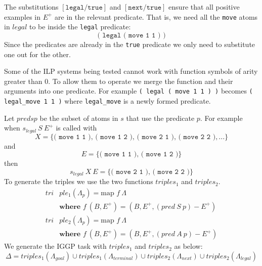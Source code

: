 The substitutions $[\texttt{legal}/\texttt{true}]$ and $[\texttt{next}/\texttt{true}]$ ensure that all positive examples in $E^+$ are in the relevant predicate. That is, we need all the \texttt{move} atoms in $legal$ to be inside the \texttt{legal} predicate:
\[\texttt{( legal ( move 1 1 ) )}\]
Since the predicates are already in the \texttt{true} predicate we only need to substitute one out for the other.

Some of the ILP systems being tested cannot work with function symbols of arity greater than 0. To allow them to operate we merge the function and their arguments into one predicate. For example \texttt{( legal ( move 1 1 ) )} becomes \verb|( legal_move 1 1 )| where \verb|legal_move| is a newly formed predicate.

Let $pred s p$ be the subset of atoms in $s$ that use the predicate $p$. For example when $s_{legal}\ S\ E^+$ is called with
\[X = \{\texttt{( move 1 1 ), ( move 1 2 ), ( move 2 1 ), ( move 2 2 )}, ...\}\]
and
\[E = \{ \texttt{( move 1 1 ), ( move 1 2 )}\}\]
then
\[s_{legal}\ X\ E = \{\texttt{( move 2 1 ), ( move 2 2 )}\}\]
To generate the triples we use the two functions $triples_1$ and $triples_2$.
\begin{align*}
tri&ple_1(\Lambda_p) = \text{map } f\ \Lambda \\
&\textbf{where } f\ (B,E^+) = (B,E^+,(pred\ S\ p) - E^+)\\
tri&ple_2(\Lambda_p) = \text{map } f\ \Lambda \\
&\textbf{where } f\ (B,E^+) = (B,E^+,(pred\ A\ p) - E^+)
\end{align*}
We generate the IGGP task with $triples_1$ and $triples_2$ as below:
\[\Delta = triples_1(\Lambda_{goal}) \cup triples_1(\Lambda_{terminal}) \cup triples_2(\Lambda_{next}) \cup triples_2(\Lambda_{legal})\]


